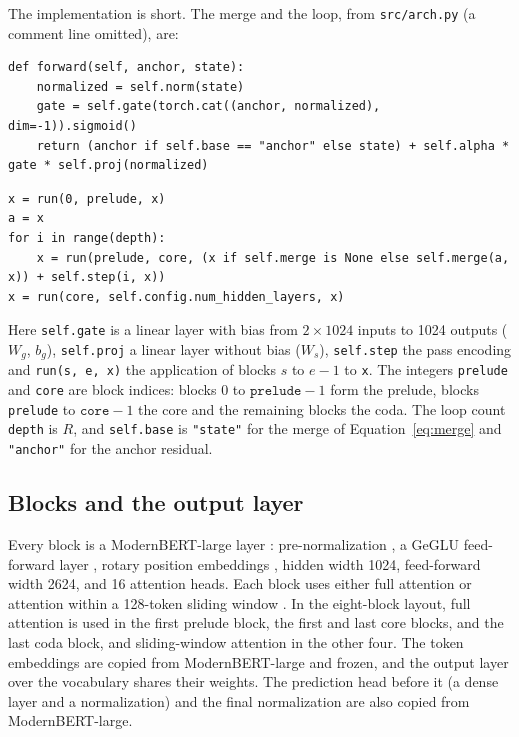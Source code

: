 \documentclass[11pt]{article}
\begin{document}
The implementation is short. The merge and the loop, from \texttt{src/arch.py} (a comment line omitted), are:
\begin{lstlisting}
def forward(self, anchor, state):
    normalized = self.norm(state)
    gate = self.gate(torch.cat((anchor, normalized), dim=-1)).sigmoid()
    return (anchor if self.base == "anchor" else state) + self.alpha * gate * self.proj(normalized)
\end{lstlisting}
\begin{lstlisting}
x = run(0, prelude, x)
a = x
for i in range(depth):
    x = run(prelude, core, (x if self.merge is None else self.merge(a, x)) + self.step(i, x))
x = run(core, self.config.num_hidden_layers, x)
\end{lstlisting}
Here \texttt{self.gate} is a linear layer with bias from $2 \times 1024$ inputs to 1024 outputs ($W_g$, $b_g$), \texttt{self.proj} a linear
layer without bias ($W_s$), \texttt{self.step} the pass encoding and \texttt{run(s, e, x)} the application of blocks $s$ to $e - 1$ to
\texttt{x}. The integers \texttt{prelude} and \texttt{core} are block indices: blocks 0 to $\texttt{prelude} - 1$ form the prelude, blocks
\texttt{prelude} to $\texttt{core} - 1$ the core and the remaining blocks the coda. The loop count \texttt{depth} is $R$, and \texttt{self.base}
is \texttt{"state"} for the merge of Equation~\eqref{eq:merge} and \texttt{"anchor"} for the anchor residual.

\subsection{Blocks and the output layer}

Every block is a ModernBERT-large layer \citep{warner2024modernbert}: pre-normalization \citep{xiong2020prelayernorm}, a GeGLU feed-forward layer
\citep{shazeer2020glu}, rotary position embeddings \citep{su2021roformer}, hidden width 1024, feed-forward width 2624, and 16 attention heads.
Each block uses either full attention or attention within a 128-token sliding window \citep{beltagy2020longformer}. In the eight-block layout,
full attention is used in the first prelude block, the first and last core blocks, and the last coda block, and sliding-window attention in the
other four. The token embeddings are copied from ModernBERT-large and
frozen, and the output layer over the vocabulary shares their weights. The prediction head before it (a dense layer and a normalization) and
the final normalization are also copied from ModernBERT-large.
\end{document}
